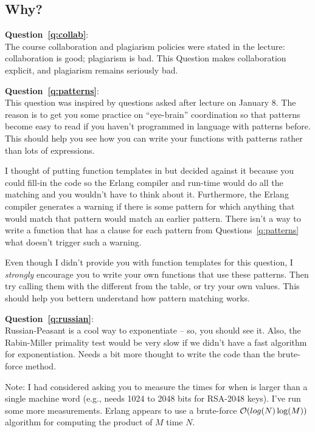 \documentclass{article}
\begin{document}
\subsection{Why?}\label{sec:why}
  \begin{description}
    \item{\textbf{Question~\ref{q:collab}}}:\\
      The course collaboration and plagiarism policies were stated in the
      lecture: collaboration is good; plagiarism is bad.
      This Question makes collaboration explicit, and plagiarism remains seriously bad.
         
    \item{\textbf{Question~\ref{q:patterns}}}:\\
      This question was inspired by questions asked after lecture on January 8.
      The reason is to get you some practice on ``eye-brain'' coordination so that patterns
      become easy to read if you haven't programmed in language with patterns before.
      This should help you see how you can write your functions with patterns rather than lots
      of  expressions.
      \par
      I thought of putting function templates in  but decided against it because
      you could fill-in the code so the Erlang compiler and run-time would do all the matching
      and you wouldn't have to think about it.
      Furthermore, the Erlang compiler generates a warning if there is some pattern for which
      anything that would match that pattern would match an earlier pattern.
      There isn't a way to write a function that has a clause for each pattern from
      Questions~\ref{q:patterns} what doesn't trigger such a warning.
      \par
      Even though I didn't provide you with function templates for this question,
      I \emph{strongly} encourage you to write your own functions that use these
      patterns.  Then try calling them with the different  from the table,
      or try your own values.  This should help you bettern understand how pattern matching works.

    \item{\textbf{Question~\ref{q:russian}}}: \\
      Russian-Peasant is a cool way to exponentiate -- so, you should see it.
      Also, the Rabin-Miller primality test would be very slow if we didn't have a fast algorithm
      for exponentiation.
      Needs a bit more thought to write the code than the brute-force method.
      \par
      Note: I had considered asking you to measure the times for  when 
      is larger than a single machine word (e.g., needs 1024 to 2048 bits for RSA-2048 keys).
      I've run some more measurements.
      Erlang appears to use a brute-force $\mathcal{O}(log(N)\log(M))$ algorithm for computing the product
      of $M$ time $N$.


\end{description}
\end{document}

